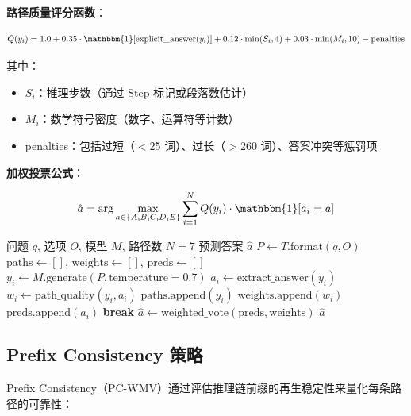 \documentclass[lang=cn,a4paper,newtx]{elegantpaper}
\begin{document}
\textbf{路径质量评分函数}：

\begin{equation}
Q(y_i) = 1.0 + 0.35 \cdot \mathbbm{1}[\text{explicit\_answer}(y_i)] + 0.12 \cdot \min(S_i, 4) + 0.03 \cdot \min(M_i, 10) - \text{penalties}
\end{equation}

其中：
\begin{itemize}
  \item $S_i$：推理步数（通过 Step 标记或段落数估计）
  \item $M_i$：数学符号密度（数字、运算符等计数）
  \item penalties：包括过短（$<$25 词）、过长（$>$260 词）、答案冲突等惩罚项
\end{itemize}

\textbf{加权投票公式}：

\begin{equation}
\hat{a} = \arg\max_{a \in \{A,B,C,D,E\}} \sum_{i=1}^{N} Q(y_i) \cdot \mathbbm{1}[a_i = a]
\end{equation}

\begin{algorithm}[htbp]
\caption{Self-Consistency（含路径质量评分）}
\begin{algorithmic}[1]
\Require 问题 $q$, 选项 $O$, 模型 $M$, 路径数 $N=7$
\Ensure 预测答案 $\hat{a}$
\State $P \gets T.\text{format}(q, O)$
\State $\text{paths} \gets []$, $\text{weights} \gets []$, $\text{preds} \gets []$
    \State $y_i \gets M.\text{generate}(P, \text{temperature}=0.7)$
    \State $a_i \gets \text{extract\_answer}(y_i)$
    \State $w_i \gets \text{path\_quality}(y_i, a_i)$ 
    \State $\text{paths}.\text{append}(y_i)$
    \State $\text{weights}.\text{append}(w_i)$
    \State $\text{preds}.\text{append}(a_i)$
        \State \textbf{break} 
    \EndIf
\EndFor
\State $\hat{a} \gets \text{weighted\_vote}(\text{preds}, \text{weights})$ 
\State \Return $\hat{a}$
\end{algorithmic}
\end{algorithm}

\subsection{Prefix Consistency 策略}

Prefix Consistency（PC-WMV）通过评估推理链前缀的再生稳定性来量化每条路径的可靠性：
\end{document}

